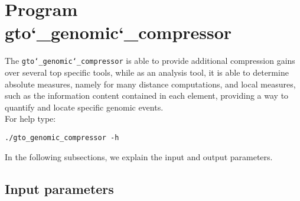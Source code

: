 \section{Program gto\char`_genomic\char`_compressor}
The \texttt{gto\char`_genomic\char`_compressor} is able to provide additional compression gains over several top specific tools, while as an analysis tool, it is able to determine absolute measures, namely for many distance computations, and local measures, such as the information content contained in each element, providing a way to quantify and locate specific genomic events.\\
For help type:
\begin{lstlisting}
./gto_genomic_compressor -h
\end{lstlisting}
In the following subsections, we explain the input and output parameters.

\subsection*{Input parameters}

